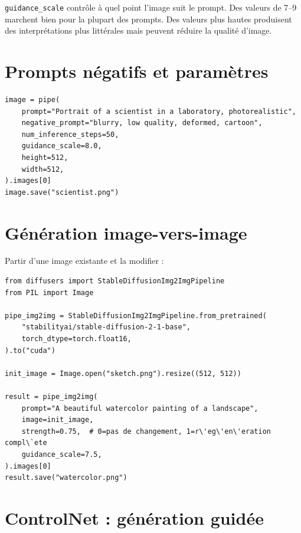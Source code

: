 \begin{aitip}
\texttt{guidance\_scale} contr\^ole \`a quel point l'image suit le prompt. Des valeurs de 7--9 marchent bien pour la plupart des prompts. Des valeurs plus hautes produisent des interpr\'etations plus litt\'erales mais peuvent r\'eduire la qualit\'e d'image.
\end{aitip}

\section{Prompts n\'egatifs et param\`etres}

\begin{verbatim}
image = pipe(
    prompt="Portrait of a scientist in a laboratory, photorealistic",
    negative_prompt="blurry, low quality, deformed, cartoon",
    num_inference_steps=50,
    guidance_scale=8.0,
    height=512,
    width=512,
).images[0]
image.save("scientist.png")
\end{verbatim}

\section{G\'en\'eration image-vers-image}

Partir d'une image existante et la modifier :

\begin{verbatim}
from diffusers import StableDiffusionImg2ImgPipeline
from PIL import Image

pipe_img2img = StableDiffusionImg2ImgPipeline.from_pretrained(
    "stabilityai/stable-diffusion-2-1-base",
    torch_dtype=torch.float16,
).to("cuda")

init_image = Image.open("sketch.png").resize((512, 512))

result = pipe_img2img(
    prompt="A beautiful watercolor painting of a landscape",
    image=init_image,
    strength=0.75,  # 0=pas de changement, 1=r\'eg\'en\'eration compl\`ete
    guidance_scale=7.5,
).images[0]
result.save("watercolor.png")
\end{verbatim}

\section{ControlNet : g\'en\'eration guid\'ee}

